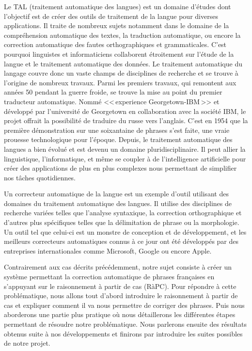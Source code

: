\documentclass{article}
\begin{document}
Le TAL (traitement automatique des langues) est un domaine d'\'{e}tudes dont l'objectif est de cr\'{e}er des outils de traitement de la langue pour diverses applications. Il traite de nombreux sujets notamment dans le domaine de la compr\'{e}hension automatique des textes, la traduction automatique, ou encore la correction automatique des fautes orthographiques et grammaticales. C'est pourquoi linguistes et informaticiens collaborent \'{e}troitement sur l'\'{e}tude de la langue et le traitement automatique des donn\'{e}es. Le traitement automatique du langage couvre donc un vaste champs de disciplines de recherche et se trouve \`{a} l'origine de nombreux travaux. 
\newline
\newline
Parmi les premiers travaux, qui remontent aux ann\'{e}es 50 pendant la guerre froide, se trouve la mise au point du premier traducteur automatique. Nomm\'{e} <<\,experience Georgetown-IBM\,>> et d\'{e}velopp\'{e} par l'universit\'{e} de Georgetown en collaboration avec la soci\'{e}t\'{e} IBM, le projet offrait la possibilit\'{e} de traduire du russe vers l'anglais. C'est en 1954 que la premi\`{e}re d\'{e}monstration sur une soixantaine de phrases s'est faite, une vraie prouesse technologique pour l'\'{e}poque. Depuis, le traitement automatique des langues a bien \'{e}volu\'{e} et est devenu un domaine pluridisciplinaire. Il peut allier la linguistique, l'informatique, et m\^{e}me se coupler \`{a} de l'intelligence artificielle pour cr\'{e}er des applications de plus en plus complexes nous permettant de simplifier nos t\^{a}ches quotidiennes. 
\newline

Un correcteur automatique de la langue est un exemple d'outil utilisant des domaines du traitement automatique des langues. Il utilise des disciplines de recherche vari\'{e}es telles que l'analyse syntaxique, la correction orthographique et d'autres plus sp\'{e}cifiques telles que la d\'{e}limitation de phrase ou la morphologie. Un outil tel que celui-ci est un monstre de conception et de d\'{e}veloppement, et les meilleurs correcteurs automatiques connus \`{a} ce jour ont \'{e}t\'{e} d\'{e}velopp\'{e}s par des entreprises internationales comme Microsoft, Google ou encore Apple. 
\newline

Contrairement aux cas d\'{e}crits pr\'{e}c\'{e}demment, notre sujet consiste \`{a} cr\'{e}er un syst\`{e}me permettant la correction automatique de phrases fran\c{c}aises en s'appuyant sur le raisonnement \`{a} partir de cas (R\`{a}PC). Pour r\'{e}pondre \`{a} cette probl\'{e}matique, nous allons tout d'abord introduire le raisonnement \`{a} partir de cas et expliquer comment il va nous permettre de corriger des phrases. Puis nous aborderons une partie plus pratique o\`{u} nous d\'{e}taillerons les diff\'{e}rentes \'{e}tapes permettant de r\'{e}soudre notre probl\'{e}matique. Nous parlerons ensuite des r\'{e}sultats obtenus suite \`{a} nos d\'{e}veloppements et finirons par introduire les suites possibles de notre projet.
\newline
\end{document}
